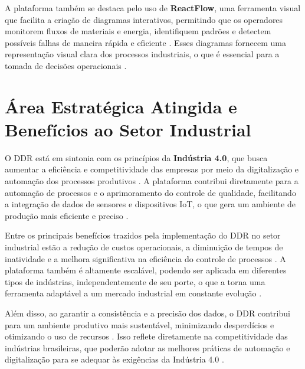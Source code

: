 A plataforma também se destaca pelo uso de \textbf{ReactFlow}, uma ferramenta visual que facilita a criação de diagramas interativos, permitindo que os operadores monitorem fluxos de materiais e energia, identifiquem padrões e detectem possíveis falhas de maneira rápida e eficiente \cite{graph}. Esses diagramas fornecem uma representação visual clara dos processos industriais, o que é essencial para a tomada de decisões operacionais \cite{frontendperfomance}.

\section{Área Estratégica Atingida e Benefícios ao Setor Industrial}

O DDR está em sintonia com os princípios da \textbf{Indústria 4.0}, que busca aumentar a eficiência e competitividade das empresas por meio da digitalização e automação dos processos produtivos \cite{industry4}. A plataforma contribui diretamente para a automação de processos e o aprimoramento do controle de qualidade, facilitando a integração de dados de sensores e dispositivos IoT, o que gera um ambiente de produção mais eficiente e preciso \cite{industryiot}.

Entre os principais benefícios trazidos pela implementação do DDR no setor industrial estão a redução de custos operacionais, a diminuição de tempos de inatividade e a melhora significativa na eficiência do controle de processos \cite{industryinternet}. A plataforma também é altamente escalável, podendo ser aplicada em diferentes tipos de indústrias, independentemente de seu porte, o que a torna uma ferramenta adaptável a um mercado industrial em constante evolução \cite{industrybuild}.

Além disso, ao garantir a consistência e a precisão dos dados, o DDR contribui para um ambiente produtivo mais sustentável, minimizando desperdícios e otimizando o uso de recursos \cite{industrydigital}. Isso reflete diretamente na competitividade das indústrias brasileiras, que poderão adotar as melhores práticas de automação e digitalização para se adequar às exigências da Indústria 4.0 \cite{industrychina}.